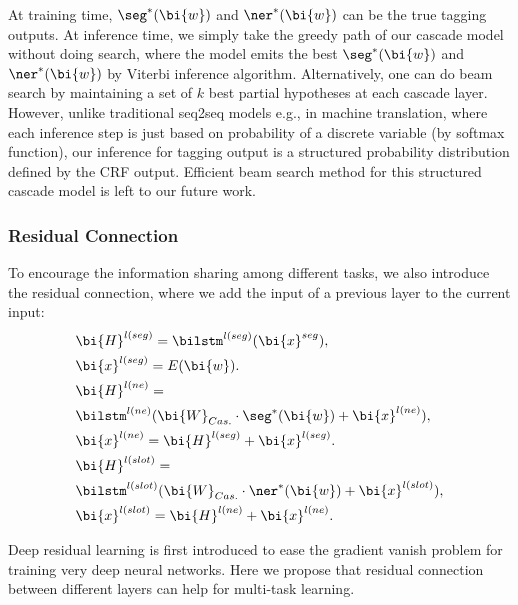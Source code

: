 At training time, $\seg^*(\bi{w})$ and $\ner^*(\bi{w})$ can be the 
true tagging outputs.
At inference time, we simply take the greedy path of our cascade model 
without doing search, where the model emits the
best $\seg^*(\bi{w})$ and $\ner^*(\bi{w})$ by Viterbi inference algorithm.
Alternatively, one can do beam search \cite{sutskever2014sequence,vinyals2015show} by maintaining a set of $k$ best partial hypotheses at each cascade layer.
However, unlike traditional seq2seq models e.g., in machine translation,
where each inference step is just based on probability of a discrete variable 
(by softmax function), our inference for tagging output is a 
structured probability distribution defined by the CRF output.
Efficient beam search method for this structured cascade model is 
left to our future work.

\subsubsection{Residual Connection}
To encourage the information sharing among different tasks,
we also introduce the residual connection,
where we add the input of a previous layer to the current input:
\begin{eqnarray*}
	& \bi{H}^{l(seg)}=\bilstm^{l(seg)}(\bi{x}^{seg}), \\
	& \bi{x}^{l(seg)}=E(\bi{w}). \\
	& \bi{H}^{l(ne)}= \\
	& \bilstm^{l(ne)}(\bi{W}_{Cas.}\cdot \seg^*(\bi{w})+\bi{x}^{l(ne)}), \\
	& \bi{x}^{l(ne)}= \bi{H}^{l(seg)}+\bi{x}^{l(seg)}. \\
	& \bi{H}^{l(slot)}= \\
	& \bilstm^{l(slot)}(\bi{W}_{Cas.}\cdot \ner^*(\bi{w})+\bi{x}^{l(slot)}), \\
	& \bi{x}^{l(slot)}= \bi{H}^{l(ne)}+\bi{x}^{l(ne)}.
\end{eqnarray*}

Deep residual learning \cite{he2016deep} is first introduced to ease the gradient vanish problem for training very deep neural networks.
Here we propose that residual connection between different layers can help for multi-task learning.

